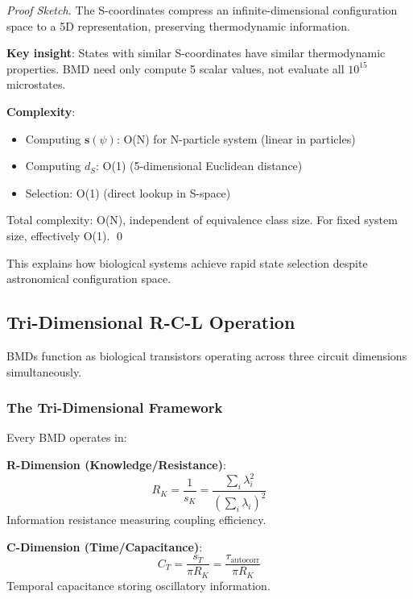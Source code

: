 \documentclass[11pt,onecolumn]{article}
\begin{document}
\begin{proof}[Proof Sketch]
The S-coordinates compress an infinite-dimensional configuration space to a 5D representation, preserving thermodynamic information.

\textbf{Key insight}: States with similar S-coordinates have similar thermodynamic properties. BMD need only compute 5 scalar values, not evaluate all $10^{15}$ microstates.

\textbf{Complexity}:
\begin{itemize}
\item Computing $\mathbf{s}(\psi)$: O(N) for N-particle system (linear in particles)
\item Computing $d_S$: O(1) (5-dimensional Euclidean distance)  
\item Selection: O(1) (direct lookup in S-space)
\end{itemize}

Total complexity: O(N), independent of equivalence class size. For fixed system size, effectively O(1). \qed
\end{proof}

This explains how biological systems achieve rapid state selection despite astronomical configuration space.

\subsection{Tri-Dimensional R-C-L Operation}

BMDs function as biological transistors operating across three circuit dimensions simultaneously.

\subsubsection{The Tri-Dimensional Framework}

Every BMD operates in:

\textbf{R-Dimension (Knowledge/Resistance)}:
\begin{equation}
R_K = \frac{1}{s_K} = \frac{\sum_i \lambda_i^2}{(\sum_i \lambda_i)^2}
\end{equation}
Information resistance measuring coupling efficiency.

\textbf{C-Dimension (Time/Capacitance)}:
\begin{equation}
C_T = \frac{s_T}{\pi R_K} = \frac{\tau_{\text{autocorr}}}{\pi R_K}
\end{equation}
Temporal capacitance storing oscillatory information.
\end{document}
